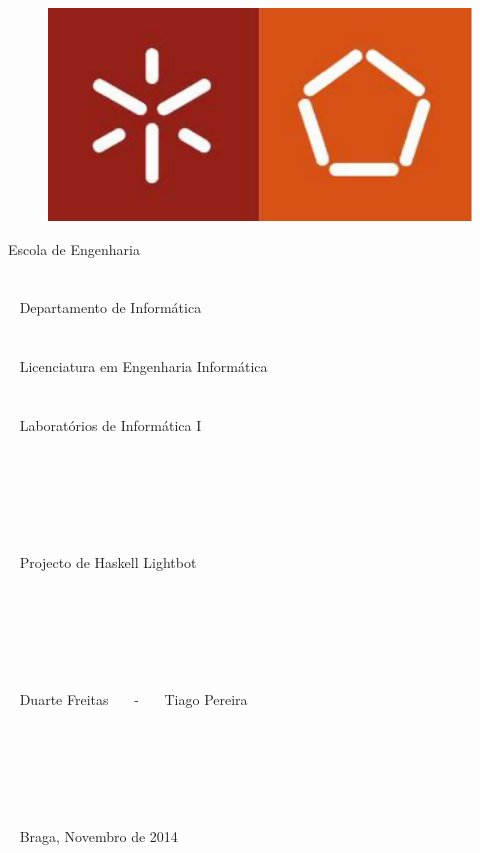 \documentclass{report}
\begin{document}

\begin{figure}
\centering
\includegraphics[scale=0.5]{logo.pdf}
\end{figure}


\begin{center}

Escola de Engenharia \\~ \\~ \\~  Departamento de Informática \\~ \\ ~ \\~ Licenciatura em Engenharia Informática \\~ \\~ \\~ Laboratórios de Informática I \\~ \\~ \\~ \\~ \\~ \\~ \\~  Projecto de Haskell Lightbot \\~ \\~ \\~ \\~ \\~ \\~ \\~ Duarte Freitas \ \ \ - \ \ \ Tiago Pereira \\~ \\~ \\~ \\~ \\~ \\~ \\~  Braga, Novembro de 2014
\end{center}
\end{document}
